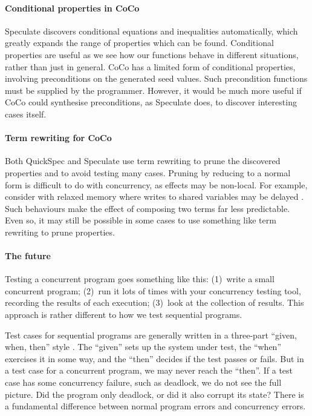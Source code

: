 \paragraph{Conditional properties in CoCo}
Speculate \parencite{braquehais2017} discovers conditional equations and
inequalities automatically, which greatly expands the range of
properties which can be found.  Conditional properties are useful as
we see how our functions behave in different situations, rather than
just in general.  CoCo has a limited form of conditional properties,
involving preconditions on the generated seed values.  Such
precondition functions must be supplied by the programmer.  However,
it would be much more useful if CoCo could synthesise preconditions,
as Speculate does, to discover interesting cases itself.

\paragraph{Term rewriting for CoCo}
Both QuickSpec \parencite{smallbone2017} and Speculate \parencite{braquehais2017}
use term rewriting to prune the discovered properties and to avoid
testing many cases.  Pruning by reducing to a normal form is difficult
to do with concurrency, as effects may be non-local.  For example,
consider with relaxed memory where writes to shared variables may be
delayed \parencite{zhang2015}.  Such behaviours make the effect of composing
two terms far less predictable.  Even so, it may still be possible in
some cases to use something like term rewriting to prune properties.

\paragraph{The future}
Testing a concurrent program goes something like this: (1)~write a
small concurrent program; (2)~run it lots of times with your
concurrency testing tool, recording the results of each execution;
(3)~look at the collection of results.  This approach is rather
different to how we test sequential programs.

Test cases for sequential programs are generally written in a
three-part ``given, when, then'' style \parencite{fowler2013}.  The
``given'' sets up the system under test, the ``when'' exercises it in
some way, and the ``then'' decides if the test passes or fails.  But
in a test case for a concurrent program, we may never reach the
``then''.  If a test case has some concurrency failure, such as
deadlock, we do not see the full picture.  Did the program only
deadlock, or did it also corrupt its state?  There is a fundamental
difference between normal program errors and concurrency errors.

